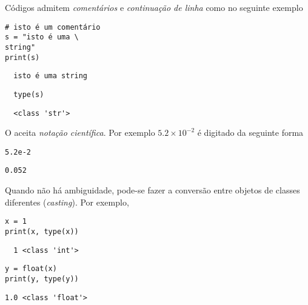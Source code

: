 \begin{obs}
  Códigos {\python} admitem \emph{comentários} e \emph{continuação de linha} como no seguinte exemplo

\begin{lstlisting}
# isto é um comentário
s = "isto é uma \
string"
print(s)
\end{lstlisting}

\begin{verbatim}
  isto é uma string
\end{verbatim}

\begin{lstlisting}
  type(s)
\end{lstlisting}

\begin{verbatim}
  <class 'str'>
\end{verbatim}

\end{obs}

\begin{obs}
  O {\python} aceita \emph{notação científica}. Por exemplo $5.2\times 10^{-2}$ é digitado da seguinte forma

\begin{lstlisting}
5.2e-2
\end{lstlisting}

\begin{verbatim}
0.052
\end{verbatim}

\end{obs}

\begin{obs}\normalfont{(\hl{\textit{Casting}}.)}
  Quando não há ambiguidade, pode-se fazer a conversão entre objetos de classes diferentes (\textit{casting}). Por exemplo,

\begin{lstlisting}
x = 1
print(x, type(x))
\end{lstlisting}

\begin{verbatim}
  1 <class 'int'>
\end{verbatim}

\begin{lstlisting}
y = float(x)
print(y, type(y))
\end{lstlisting}

\begin{verbatim}
1.0 <class 'float'>  
\end{verbatim}

\end{obs}


